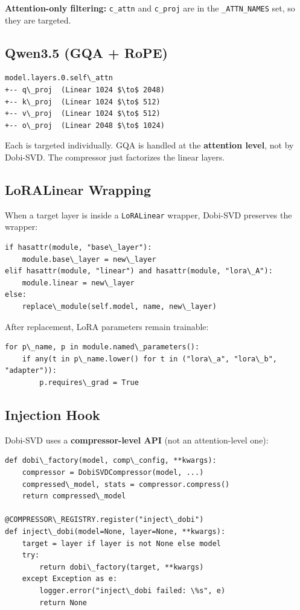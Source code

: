\textbf{Attention-only filtering:} \texttt{c\_attn} and \texttt{c\_proj} are in the \texttt{\_ATTN\_NAMES} 
set, so they are targeted.

\subsection{Qwen3.5 (GQA + RoPE)}

\begin{lstlisting}
model.layers.0.self\_attn
+-- q\_proj  (Linear 1024 $\to$ 2048)
+-- k\_proj  (Linear 1024 $\to$ 512)
+-- v\_proj  (Linear 1024 $\to$ 512)
+-- o\_proj  (Linear 2048 $\to$ 1024)
\end{lstlisting}

Each is targeted individually. GQA is handled at the \textbf{attention level}, 
not by Dobi-SVD. The compressor just factorizes the linear layers.

\subsection{LoRALinear Wrapping}

When a target layer is inside a \texttt{LoRALinear} wrapper, Dobi-SVD preserves 
the wrapper:

\begin{lstlisting}
if hasattr(module, "base\_layer"):
    module.base\_layer = new\_layer
elif hasattr(module, "linear") and hasattr(module, "lora\_A"):
    module.linear = new\_layer
else:
    replace\_module(self.model, name, new\_layer)
\end{lstlisting}

After replacement, LoRA parameters remain trainable:

\begin{lstlisting}
for p\_name, p in module.named\_parameters():
    if any(t in p\_name.lower() for t in ("lora\_a", "lora\_b", "adapter")):
        p.requires\_grad = True
\end{lstlisting}

\subsection{Injection Hook}

Dobi-SVD uses a \textbf{compressor-level API} (not an attention-level one):

\begin{lstlisting}
def dobi\_factory(model, comp\_config, **kwargs):
    compressor = DobiSVDCompressor(model, ...)
    compressed\_model, stats = compressor.compress()
    return compressed\_model

@COMPRESSOR\_REGISTRY.register("inject\_dobi")
def inject\_dobi(model=None, layer=None, **kwargs):
    target = layer if layer is not None else model
    try:
        return dobi\_factory(target, **kwargs)
    except Exception as e:
        logger.error("inject\_dobi failed: \%s", e)
        return None
\end{lstlisting}

